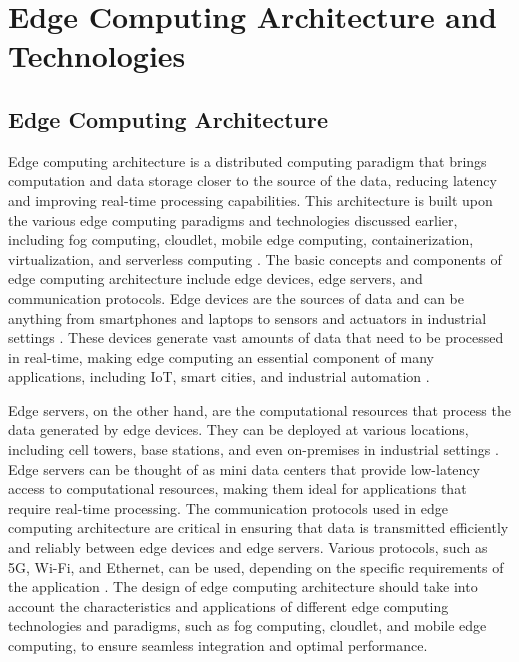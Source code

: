 \documentclass[11pt]{article}
\begin{document}
\section{Edge Computing Architecture and Technologies}

\subsection{Edge Computing Architecture}

Edge computing architecture is a distributed computing paradigm that brings computation and data storage closer to the source of the data, reducing latency and improving real-time processing capabilities. This architecture is built upon the various edge computing paradigms and technologies discussed earlier, including fog computing, cloudlet, mobile edge computing, containerization, virtualization, and serverless computing \cite{ref2}. The basic concepts and components of edge computing architecture include edge devices, edge servers, and communication protocols. Edge devices are the sources of data and can be anything from smartphones and laptops to sensors and actuators in industrial settings \cite{ref2}. These devices generate vast amounts of data that need to be processed in real-time, making edge computing an essential component of many applications, including IoT, smart cities, and industrial automation \cite{ref11}.

Edge servers, on the other hand, are the computational resources that process the data generated by edge devices. They can be deployed at various locations, including cell towers, base stations, and even on-premises in industrial settings \cite{ref3}. Edge servers can be thought of as mini data centers that provide low-latency access to computational resources, making them ideal for applications that require real-time processing. The communication protocols used in edge computing architecture are critical in ensuring that data is transmitted efficiently and reliably between edge devices and edge servers. Various protocols, such as 5G, Wi-Fi, and Ethernet, can be used, depending on the specific requirements of the application \cite{ref1}. The design of edge computing architecture should take into account the characteristics and applications of different edge computing technologies and paradigms, such as fog computing, cloudlet, and mobile edge computing, to ensure seamless integration and optimal performance.
\end{document}
